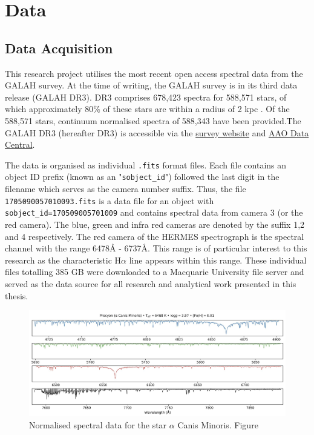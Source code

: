 \chapter{Data}

\section{Data Acquisition}

This research project utilises the most recent open access spectral data from the GALAH survey. At the time of writing, the GALAH survey is in its third data release (GALAH DR3). DR3 comprises 678,423 spectra for 588,571 stars, of which approximately 80\% of these stars are within a radius of 2 kpc \cite{buder2021galah+}. Of the 588,571 stars, continuum normalised spectra of 588,343 have been provided.The GALAH DR3 (hereafter DR3) is accessible via the \href{https://www.galah-survey.org/}{survey website} and \href{https://datacentral.org.au/}{AAO Data Central}.

The data is organised as individual \texttt{.fits} format files. Each file contains an object ID prefix (known as an "\texttt{sobject\_id}") followed the last digit in the filename which serves as the camera number suffix. Thus, the file \texttt{1705090057010093.fits} is a data file for an object with \texttt{sobject\_id=170509005701009} and contains spectral data from camera 3 (or the red camera). The blue, green and infra red cameras are denoted by the suffix 1,2 and 4 respectively.
The red camera of the HERMES spectrograph is the spectral channel with the range 6478\r{A} - 6737\r{A}\cite{sheinis2014first}. This range is of particular interest to this research as the characteristic H$\alpha$ line appears within this range. These individual files totalling 385 GB were downloaded to a Macquarie University file server and served as the data source for all research and analytical work presented in this thesis.

\begin{figure}[h]
\centering
\includegraphics[scale=.25]{figures/galah cameras.jpeg}
\caption{Normalised spectral data for the star $\alpha$ Canis Minoris. Figure \cite{kasai2013type}}
\end{figure}

